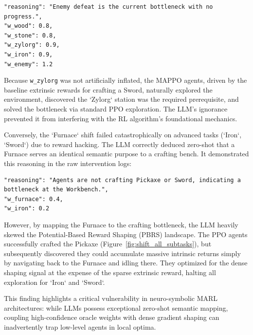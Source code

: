 \begin{lstlisting}[style=llmprompt, caption={Actual JSONL log excerpt during the 'Zylorg' environment shift.}, label={lst:zylorg_log}]
"reasoning": "Enemy defeat is the current bottleneck with no progress.",
"w_wood": 0.8,
"w_stone": 0.8,
"w_zylorg": 0.9,
"w_iron": 0.9,
"w_enemy": 1.2
\end{lstlisting}

Because \texttt{w\_zylorg} was not artificially inflated, the MAPPO agents, driven by the baseline extrinsic rewards for crafting a Sword, naturally explored the environment, discovered the `Zylorg` station was the required prerequisite, and solved the bottleneck via standard PPO exploration. The LLM's ignorance prevented it from interfering with the RL algorithm's foundational mechanics.

Conversely, the `Furnace` shift failed catastrophically on advanced tasks (`Iron`, `Sword`) due to reward hacking. The LLM correctly deduced zero-shot that a Furnace serves an identical semantic purpose to a crafting bench. It demonstrated this reasoning in the raw intervention logs:

\begin{lstlisting}[style=llmprompt, caption={Actual JSONL log excerpt during the 'Furnace' environment shift.}, label={lst:furnace_log}]
"reasoning": "Agents are not crafting Pickaxe or Sword, indicating a bottleneck at the Workbench.",
"w_furnace": 0.4,
"w_iron": 0.2
\end{lstlisting}

However, by mapping the Furnace to the crafting bottleneck, the LLM heavily skewed the Potential-Based Reward Shaping (PBRS) landscape. The PPO agents successfully crafted the Pickaxe (Figure~\ref{fig:shift_all_subtasks}), but subsequently discovered they could accumulate massive intrinsic returns simply by navigating back to the Furnace and idling there. They optimized for the dense shaping signal at the expense of the sparse extrinsic reward, halting all exploration for `Iron` and `Sword`. 

This finding highlights a critical vulnerability in neuro-symbolic MARL architectures: while LLMs possess exceptional zero-shot semantic mapping, coupling high-confidence oracle weights with dense gradient shaping can inadvertently trap low-level agents in local optima.


